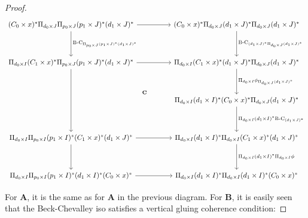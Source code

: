 \documentclass[10pt, oneside]{article}
\begin{document}
\begin{proof}
	\[\begin{tikzcd}
		{(C_0 \times x)^\ast \Pi_{d_0 \times J} \Pi_{p_0 \times J} (p_1 \times J)^\ast (d_1 \times J)^\ast} && {(C_0 \times x)^\ast \Pi_{d_0 \times J} (d_1 \times J)^\ast \Pi_{d_0 \times J} (d_1 \times J)^\ast} \\
		\\
		{\Pi_{d_0 \times I} (C_1 \times x)^\ast \Pi_{p_0 \times J} (p_1 \times J)^\ast (d_1 \times J)^\ast} && {\Pi_{d_0 \times I} (C_1 \times x)^\ast (d_1 \times J)^\ast \Pi_{d_0 \times J} (d_1 \times J)^\ast} \\
		\\
		&& {\Pi_{d_0 \times I} (d_1 \times I)^\ast (C_0 \times x)^\ast \Pi_{d_0 \times J} (d_1 \times J)^\ast} \\
		\\
		{\Pi_{d_0 \times I} \Pi_{p_0 \times I} (p_1 \times I)^\ast (C_1 \times x)^\ast (d_1 \times J)^\ast} && {\Pi_{d_0 \times I} (d_1 \times I)^\ast \Pi_{d_0 \times I} (C_1 \times x)^\ast (d_1 \times J)^\ast} \\
		\\
		{\Pi_{d_0 \times I} \Pi_{p_0 \times I} (p_1 \times I)^\ast (d_1 \times I)^\ast (C_0 \times x)^\ast} && {\Pi_{d_0 \times I} (d_1 \times I)^\ast \Pi_{d_0 \times I} (d_1 \times I)^\ast (C_0 \times x)^\ast }
		\arrow[from=1-1, to=1-3]
		\arrow["{\text{B-C}_{(d_1 \times J)^\ast \Pi_{d_0 \times J} (d_1 \times J)^\ast}}", from=1-3, to=3-3]
		\arrow["{\Pi_{d_0 \times I} \phi_{\Pi_{d_0 \times J} (d_1 \times J)^\ast}}", from=3-3, to=5-3]
		\arrow[""{name=0, anchor=center, inner sep=0}, "{\Pi_{d_0 \times I} (d_1 \times I)^\ast \text{B-C}_{(d_1 \times J)^\ast}}", from=5-3, to=7-3]
		\arrow["{\Pi_{d_0 \times I} (d_1 \times I)^\ast \Pi_{d_0 \times I} \phi}", from=7-3, to=9-3]
		\arrow[from=9-1, to=9-3]
		\arrow[from=3-1, to=3-3]
		\arrow["{\text{B-C}_{\Pi_{p_0 \times J} (p_1 \times J)^\ast (d_1 \times J)^\ast}}", from=1-1, to=3-1]
		\arrow[from=7-1, to=7-3]
		\arrow[from=3-1, to=7-1]
		\arrow[from=7-1, to=9-1]
		\arrow["{\mathbf{C}}"'{pos=0.4}, draw=none, from=3-1, to=0]
	\end{tikzcd}\]
	
	For $\mathbf{A}$, it is the same as for $\mathbf{A}$ in the previous diagram. For $\mathbf{B}$, it is easily seen that the Beck-Chevalley iso satisfies a vertical gluing coherence condition:
	

\end{proof}
\end{document}
